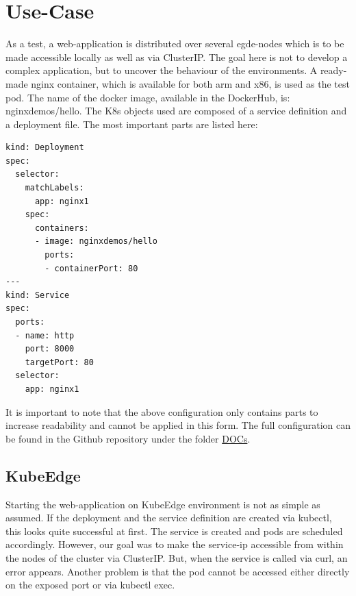 \documentclass[MSC,Master,english]{twbook}%
\begin{document}
\section{Use-Case}
\label{sec:dsrusecase}
\label{sec:dsrusecaseweb}
As a test, a web-application is distributed over several egde-nodes which is to be made accessible locally as well as via ClusterIP. The goal here is not to develop a complex application, but to uncover the behaviour of the environments. A ready-made nginx container, which is available for both arm and x86, is used as the test pod. The name of the docker image, available in the DockerHub, is: nginxdemos/hello. The \ac{K8s} objects used are composed of a service definition and a deployment file. The most important parts are listed here:

\vspace{\baselineskip}
\begin{lstlisting}[caption={Web-application code},captionpos=b]
kind: Deployment
spec:
  selector:
    matchLabels:
      app: nginx1
    spec:
      containers:
      - image: nginxdemos/hello
        ports:
        - containerPort: 80
---
kind: Service
spec:
  ports:
  - name: http
    port: 8000
    targetPort: 80
  selector:
    app: nginx1
\end{lstlisting}

It is important to note that the above configuration only contains parts to increase readability and cannot be applied in this form. The full configuration can be found in the Github repository under the folder \hyperref{https://github.com/Berndinox/K8sEdge/blob/main/DOCs/}{}{}{DOCs}.

\subsection{KubeEdge} 
Starting the web-application on KubeEdge environment is not as simple as assumed. If the deployment and the service definition are created via kubectl, this looks quite successful at first. The service is created and pods are scheduled accordingly. However, our goal was to make the service-ip accessible from within the nodes of the cluster via ClusterIP. But, when the service is called via curl, an error appears. Another problem is that the pod cannot be accessed either directly on the exposed port or via kubectl exec.
\end{document}
